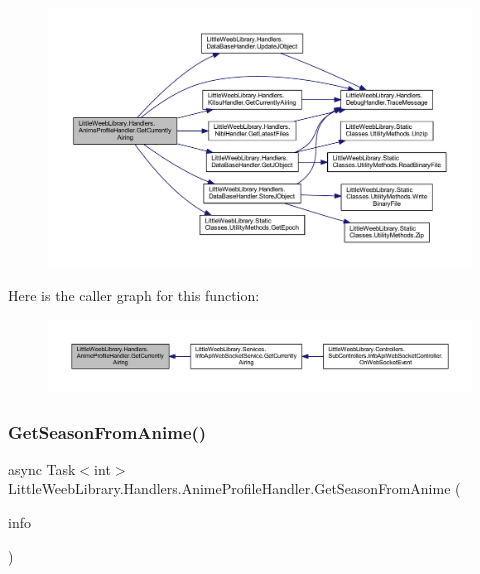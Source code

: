 \begin{figure}[H]
\begin{center}
\leavevmode
\includegraphics[width=350pt]{class_little_weeb_library_1_1_handlers_1_1_anime_profile_handler_a7469a40799e1067d871ba87679f54c37_cgraph}
\end{center}
\end{figure}
Here is the caller graph for this function\+:\nopagebreak
\begin{figure}[H]
\begin{center}
\leavevmode
\includegraphics[width=350pt]{class_little_weeb_library_1_1_handlers_1_1_anime_profile_handler_a7469a40799e1067d871ba87679f54c37_icgraph}
\end{center}
\end{figure}
\mbox{\label{class_little_weeb_library_1_1_handlers_1_1_anime_profile_handler_ad7341acd9da86cd5cee9a45b0a41f887}} 
\subsubsection{\texorpdfstring{Get\+Season\+From\+Anime()}{GetSeasonFromAnime()}}
{\footnotesize\ttfamily async Task$<$int$>$ Little\+Weeb\+Library.\+Handlers.\+Anime\+Profile\+Handler.\+Get\+Season\+From\+Anime (\begin{DoxyParamCaption}\item[{\mbox{\hyperlink{class_little_weeb_library_1_1_models_1_1_json_kitsu_anime_info}{Json\+Kitsu\+Anime\+Info}}}]{info }\end{DoxyParamCaption})\hspace{0.3cm}{\ttfamily [private]}}



